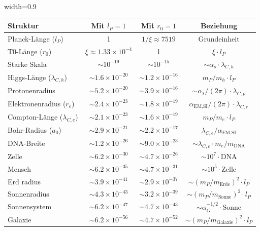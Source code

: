 \documentclass[12pt,a4paper]{article}
\newcommand{\alphaEMSI}{\alpha_{\text{EM,SI}}}
\newcommand{\tablescale}{0.9}
\begin{document}
	\begin{table}[H]
		\centering
		\begin{adjustbox}{width=\tablescale\textwidth}
			\begin{tabular}{lccc}
				\toprule
				\textbf{Struktur} & \textbf{Mit \(l_P = 1\)} & \textbf{Mit \(r_0 = 1\)} & \textbf{Beziehung} \\
				\midrule
				Planck-Länge (\(l_P\)) & 1 & \(1/\xi \approx 7519\) & Grundeinheit \\
				T0-Länge (\(r_0\)) & \(\xi \approx 1.33 \times 10^{-4}\) & 1 & \(\xi \cdot l_P\) \\
				Starke Skala & \(\sim 10^{-19}\) & \(\sim 10^{-15}\) & \(\sim \alpha_s \cdot \lambda_{C,h}\) \\
				Higgs-Länge (\(\lambda_{C,h}\)) & \(\sim 1.6 \times 10^{-20}\) & \(\sim 1.2 \times 10^{-16}\) & \(m_P/m_h \cdot l_P\) \\
				Protonenradius & \(\sim 5.2 \times 10^{-20}\) & \(\sim 3.9 \times 10^{-16}\) & \(\sim \alpha_s/(2\pi) \cdot \lambda_{C,p}\) \\
				Elektronenradius (\(r_e\)) & \(\sim 2.4 \times 10^{-23}\) & \(\sim 1.8 \times 10^{-19}\) & \(\alphaEMSI/(2\pi) \cdot \lambda_{C,e}\) \\
				Compton-Länge (\(\lambda_{C,e}\)) & \(\sim 2.1 \times 10^{-23}\) & \(\sim 1.6 \times 10^{-19}\) & \(m_P/m_e \cdot l_P\) \\
				Bohr-Radius (\(a_0\)) & \(\sim 2.9 \times 10^{-21}\) & \(\sim 2.2 \times 10^{-17}\) & \(\lambda_{C,e}/\alphaEMSI\) \\
				DNA-Breite & \(\sim 1.2 \times 10^{-26}\) & \(\sim 9.0 \times 10^{-23}\) & \(\sim \lambda_{C,e} \cdot m_e/m_{\text{DNA}}\) \\
				Zelle & \(\sim 6.2 \times 10^{-30}\) & \(\sim 4.7 \times 10^{-26}\) & \(\sim 10^7 \cdot \text{DNA}\) \\
				Mensch & \(\sim 6.2 \times 10^{-35}\) & \(\sim 4.7 \times 10^{-31}\) & \(\sim 10^5 \cdot \text{Zelle}\) \\
				Erd radius & \(\sim 3.9 \times 10^{-41}\) & \(\sim 2.9 \times 10^{-37}\) & \(\sim (m_P/m_{\text{Erde}})^2 \cdot l_P\) \\
				Sonnenradius & \(\sim 4.3 \times 10^{-43}\) & \(\sim 3.2 \times 10^{-39}\) & \(\sim (m_P/m_{\text{Sonne}})^2 \cdot l_P\) \\
				Sonnensystem & \(\sim 6.2 \times 10^{-47}\) & \(\sim 4.7 \times 10^{-43}\) & \(\sim \alpha_G^{-1/2} \cdot \text{Sonne}\) \\
				Galaxie & \(\sim 6.2 \times 10^{-56}\) & \(\sim 4.7 \times 10^{-52}\) & \(\sim (m_P/m_{\text{Galaxie}})^2 \cdot l_P\) \\

\end{tabular}
\end{adjustbox}
\end{table}
\end{document}
